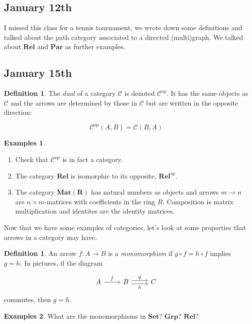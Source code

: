 \documentclass[11pt]{amsart}
\theoremstyle{plain}
\theoremstyle{definition}
\newtheorem{defn}[thm]{Definition}
\newtheorem*{egs*}{Examples}
\newcommand{\cC}{{\mathcal C}}
\newcommand{\Rel}{\mathbf{Rel}}
\newcommand{\Set}{{\mathbf{Set}}}
\newcommand{\Grp}{\mathbf{Grp}}
\newcommand{\noi}{{\noindent}}
\begin{document}
\subsection{January 12th}
I missed this class for a tennis tournament, we wrote down some definitions and talked about the path category associated to a directed (multi)graph. We talked about $\mathbf{Rel}$ and $\mathbf{Par}$ as further examples.  

\subsection{January 15th} 

\begin{defn}
The \textit{dual} of a category $\cC$ is denoted $\cC^{op}$. It has the same objects as $\cC$ and the arrows are determined by those in $\cC$ but are written in the opposite direction: 

\[ \cC^{op} (A,B) = \cC (B,A) \]
\end{defn}

\begin{egs*}
\begin{enumerate}
\item Check that $\cC^{op}$ is in fact a category. 
\item The category $\mathbf{Rel}$ is isomorphic to its opposite, $\mathbf{Rel}^{op}$. 
\item The category $\mathbf{Mat(R)}$ has natural numbers as objects and arrows $m \to n$ are $n \times m$-matrices with coefficients in the ring $R$. Composition is matrix multiplication and identites are the identity matrices. 
\end{enumerate}
\end{egs*}

Now that we have some examples of categories, let's look at some properties that arrows in a category may have. 

\begin{defn}
An arrow $f : A \to B$ is a \textit{monomorphism} if $g \circ f = h \circ f$ implies $g = h$. In pictures, if the diagram

\[ \begin{tikzcd}
  A \rar["f"] & B \rar[shift left, "g"] \rar[shift right, "h"'] & C
\end{tikzcd}\]
\noi commutes, then $g = h$. 
\end{defn}

\begin{egs*}
What are the monomorphisms in $\Set$? $\Grp$? $\Rel$?  
\end{egs*}
\end{document}
